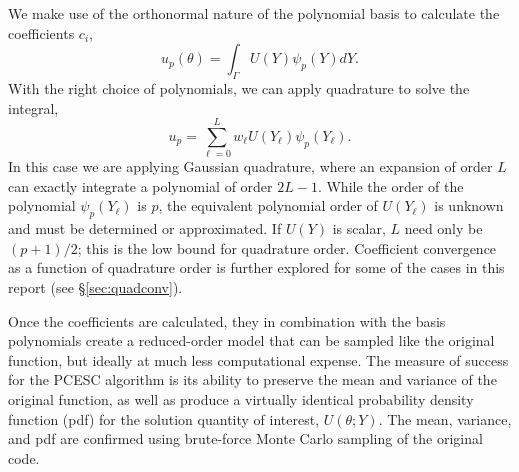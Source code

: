 \documentclass[11pt]{article} %
\begin{document}
We make use of the orthonormal nature of the polynomial basis to calculate the coefficients $c_i$,
\begin{equation}
u_p(\theta) = \int_\Gamma U(Y)\psi_p(Y)dY.
\end{equation}
With the right choice of polynomials, we can apply quadrature to solve the integral,
\begin{equation}
u_p = \sum_{\ell=0}^{L} w_\ell U(Y_\ell) \psi_p(Y_\ell).
\end{equation}
In this case we are applying Gaussian quadrature, where an expansion of order $L$ can exactly integrate a polynomial of order $2L-1$.  While the order of the polynomial $\psi_p(Y_\ell)$ is $p$, the equivalent polynomial order of $U(Y_\ell)$ is unknown and must be determined or approximated.  If $U(Y)$ is scalar, $L$ need only be $(p+1)/2$; this is the low bound for quadrature order.  Coefficient convergence as a function of quadrature order is further explored for some of the cases in this report (see \S \ref{sec:quadconv}).

Once the coefficients are calculated, they in combination with the basis polynomials create a reduced-order model that can be sampled like the original function, but ideally at much less computational expense.  The measure of success for the PCESC algorithm is its ability to preserve the mean and variance of the original function, as well as produce a virtually identical probability density function (pdf) for the solution quantity of interest, $U(\theta;Y)$.  The mean, variance, and pdf are confirmed using brute-force Monte Carlo sampling of the original code.





\end{document}
